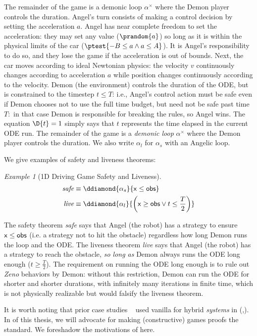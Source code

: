 \documentclass[12pt]{cmuthesis}
\theoremstyle{definition}
\theoremstyle{remark}
\newtheorem{example}{Example}
\newcommand{\obsvar}{{\sf obs}\xspace}
\newcommand{\xvar}{{\sf x}\xspace}
\newcommand{\rref}[2][]{\prettyref{#2}}
\begin{document}
The remainder of the game is a demonic loop $\alpha^\times$ where the Demon player controls the duration.
Angel's turn consists of making a control decision by setting the acceleration $a$.
Angel has near complete freedom to set the acceleration: they may set any value ($\prandom{a}$) so long as it is within the physical limits of the car ($\ptest{-B \leq a \land a \leq A}$).
It is Angel's responsibility to do so, and they lose the game if the acceleration is out of bounds.
Next, the car moves according to ideal Newtonian physics: the velocity $v$ continuously changes according to acceleration $a$ while position changes continuously according to the velocity.
Demon (the environment) controls the duration of the ODE, but is constrained to the timestep $t \leq T$: i.e., Angel's control action must be safe even if Demon chooses not to use the full time budget, but need not be safe past time $T:$ in that case Demon is responsible for breaking the rules, so Angel wins.
The equation $\D{t}=1$ simply says that $t$ represents the time elapsed in the current ODE run.
The remainder of the game is a \emph{demonic loop} $\alpha^\times$ where the Demon player controls the duration.
We also write $\alpha_l$ for $\alpha_s$ with an Angelic loop.

We give examples of safety and liveness theorems:
\begin{example}[1D Driving Game Safety and Liveness]
  \begin{align*}
    \textit{safe} &\equiv \ddiamond{\alpha_s}{\xvar \leq \obsvar}\\
    \textit{live} &\equiv \ddiamond{\alpha_l}{\left(\xvar \geq \obsvar \lor t \leq \frac{T}{2}\right)}
  \end{align*}
\end{example}
The safety theorem \emph{safe} says that Angel (the robot) has a strategy to ensure $\xvar \leq \obsvar$ (i.e. a strategy not to hit the obstacle) regardless how long Demon runs the loop and the ODE.
The liveness theorem \emph{live} says that Angel (the robot) has a strategy to reach the obstacle, \emph{so long as} Demon always runs the ODE long enough ($t \geq \frac{T}{2}$).
The requirement on running the ODE long enough is to rule out \emph{Zeno} behaviors by Demon: without this restriction, Demon can run the ODE for shorter and shorter durations, with infinitely many iterations in finite time, which is not physically realizable but would falsify the liveness theorem.

It is worth noting that prior case studies ~\cite{DBLP:conf/emsoft/JeanninGKGSZP15,DBLP:conf/fm/LoosPN11,DBLP:journals/ijrr/MitschGVP17,DBLP:conf/hybrid/PlatzerQ08} used vanilla \dL for hybrid \emph{systems} in \KeYmaeraX (\rref{sec:veriphy},\rref{sec:ground-robotics}).
In \rref{ch:cdgl} of this thesis, we will advocate for making (constructive) games proofs the standard.
We foreshadow the motivations of \rref{ch:cdgl} here.
\end{document}
